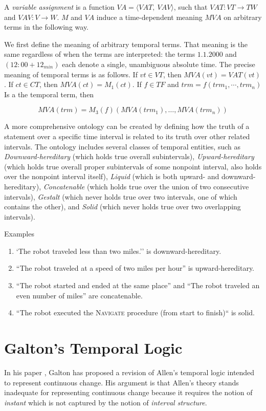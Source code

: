 A \textit{variable assignment} is a function $ VA = \langle VAT,\ VAV \rangle$, such that $VAT: VT \to TW$ and
$VAV: V \to W$. $M$ and $VA$ induce a time-dependent meaning $MVA$ on arbitrary terms in the following way.

We first define the meaning of arbitrary temporal terms. That meaning is the same regardless of when the terms are interpreted: the terms $1.1.2000$ and
$(12:00 + 12_{min})$ each denote a single, unambiguous absolute time. The precise
meaning of temporal terms is as follows. If $vt \in VT $, then $MVA (vt) = VAT (vt)$.
If $ct \in CT$, then $MVA (ct) = M_1(ct)$. If $f \in T F$ and $trm = f(trm_1, \cdots, trm_n)$ Is a
the temporal term, then

\[
	MVA(trm) = M_3(f)(MVA(trm_1), \dots, MVA(trm_n))
\]

A more comprehensive ontology can be created by defining how the truth of a statement over a specific time interval is related to its truth over other related intervals.
The ontology includes several classes of temporal entities, such as \textit{Downward-hereditary} (which holds true overall subintervals), \textit{Upward-hereditary} (which holds true overall proper subintervals of some nonpoint interval, also holds over the nonpoint interval itself),
\textit{Liquid} (which is both upward- and downward-hereditary), \textit{Concatenable} (which holds true over the union of two consecutive intervals),
\textit{Gestalt} (which never holds true over two intervals, one of which contains the other), and \textit{Solid} (which never holds true over two overlapping intervals).

\begin{exmp} Examples
	\begin{enumerate}
		\item `The robot traveled less than two miles.'' is downward-hereditary.
		\item ``The robot traveled at a speed of two miles per hour'' is upward-hereditary.
		\item ``The robot started and ended at the same place'' and ``The robot traveled an even number of miles'' are concatenable.
		\item ``The robot executed the \textsc{Navigate} procedure (from start to finish)`` is solid.
	\end{enumerate}
\end{exmp}


\section{Galton's Temporal Logic}
In his paper \cite{galton2004}, Galton has proposed a revision of Allen's temporal logic intended to represent continuous change.
His argument is that Allen's theory stands inadequate for representing continuous change because it requires the notion of \textit{instant} which is not captured by the notion of \textit{interval structure}.

